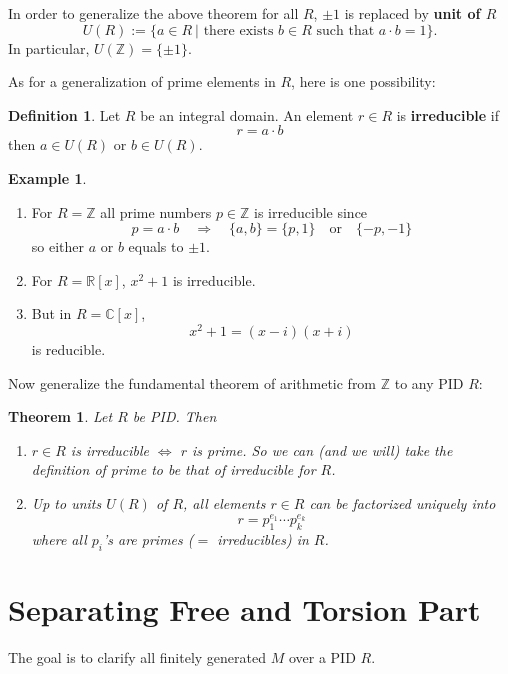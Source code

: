 \documentclass[11pt,openany]{book}
\theoremstyle{plain}
\newtheorem{theorem}{Theorem}[chapter]
\theoremstyle{definition}
\newtheorem{definition}[definition]{Definition}
\newtheorem{example}[example]{Example}
\theoremstyle{remark}
\begin{document}
In order to generalize the above theorem for all $R$, $\pm 1$ is replaced by {\bf unit of $R$}
$$U(R):=\{a\in R\ |\text{ there exists }b\in R\text{ such that }a\cdot b=1\}.$$
In particular, $U(\mathbb{Z}) = \{\pm 1\}$. 

As for a generalization of prime elements in $R$, here is one possibility:

\begin{definition}
    Let $R$ be an integral domain. An element $r\in R$ is {\bf irreducible} if
    $$r=a\cdot b$$
    then $a\in U(R)$ or $b\in U(R)$.
\end{definition}

\begin{example}\
    \begin{enumerate}
        \item For $R=\mathbb{Z}$ all prime numbers $p\in\mathbb{Z}$ is irreducible since
        $$p=a\cdot b\quad\Rightarrow\quad\{a,b\}=
            \{p,1\} \quad \text{or}\quad
            \{-p,-1\}$$
        so either $a$ or $b$ equals to $\pm1$.
        \item For $R=\mathbb{R}[x]$, $x^2+1$ is irreducible.\\
        \item But in $R=\mathbb{C}[x]$, 
        $$x^2+1=(x-i)(x+i)$$ is reducible.
    \end{enumerate}
\end{example}

Now generalize the fundamental theorem of arithmetic from $\mathbb{Z}$ to any PID $R$:

\begin{theorem}
    Let $R$ be PID. Then
    \begin{enumerate}
        \item $r\in R$ is irreducible $\Leftrightarrow$ $r$ is prime. So we can (and we will) take the definition of prime to be that of irreducible for $R$.
        \item Up to units $U(R)$ of $R$, all elements $r\in R$ can be factorized uniquely into 
        $$r=p_1^{e_1}\cdots p_k^{e_k}$$
        where all $p_i$'s are primes ($=$ irreducibles) in $R$.
    \end{enumerate}
\end{theorem}

\section{Separating Free and Torsion Part}
The goal is to clarify all finitely generated $M$ over a PID $R$.
\end{document}
